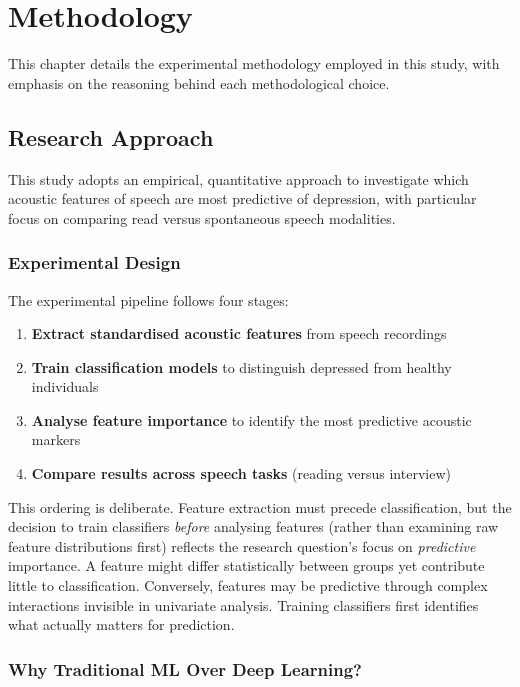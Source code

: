 \chapter{Methodology}

This chapter details the experimental methodology employed in this study, with emphasis on the reasoning behind each methodological choice.

\section{Research Approach}

This study adopts an empirical, quantitative approach to investigate which acoustic features of speech are most predictive of depression, with particular focus on comparing read versus spontaneous speech modalities.

\subsection{Experimental Design}

The experimental pipeline follows four stages:

\begin{enumerate}
    \item \textbf{Extract standardised acoustic features} from speech recordings
    \item \textbf{Train classification models} to distinguish depressed from healthy individuals
    \item \textbf{Analyse feature importance} to identify the most predictive acoustic markers
    \item \textbf{Compare results across speech tasks} (reading versus interview)
\end{enumerate}

This ordering is deliberate. Feature extraction must precede classification, but the decision to train classifiers \textit{before} analysing features (rather than examining raw feature distributions first) reflects the research question's focus on \textit{predictive} importance. A feature might differ statistically between groups yet contribute little to classification. Conversely, features may be predictive through complex interactions invisible in univariate analysis. Training classifiers first identifies what actually matters for prediction.

\subsection{Why Traditional ML Over Deep Learning?}

